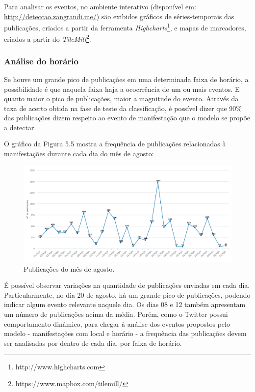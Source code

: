 Para analisar os eventos, no ambiente interativo (disponível em: \url{http://deteccao.zangrandi.me/}) são exibidos gráficos de séries-temporais das publicações, criados a partir da ferramenta \textit{Highcharts}\footnote{http://www.highcharts.com}, e mapas de marcadores, criados a partir do \textit{TileMill}\footnote{https://www.mapbox.com/tilemill/}.

\subsubsection*{Análise do horário}

Se houve um grande pico de publicações em uma determinada faixa de horário, a possibilidade é que naquela faixa haja a ococrrência de um ou mais eventos. E quanto maior o pico de publicações, maior a magnitude do evento. Através da taxa de acerto obtida na fase de teste da classificação, é possível dizer que 90\% das publicações dizem respeito ao evento de manifestação que o modelo se propõe a detectar.

O gráfico da Figura 5.5 mostra a frequência de publicações relacionadas à manifestações durante cada dia do mês de agosto:

\begin{figure}[htpb]
  \begin{center}
    \includegraphics[width=1.0\textwidth]{figuras/grafico-mes.pdf}
    \caption{Publicações do mês de agosto.}
  \end{center}
\end{figure}

É possível observar variações na quantidade de publicações enviadas em cada dia. Particularmente, no dia 20 de agosto, há um grande pico de publicações, podendo indicar algum evento relevante naquele dia. Os dias 08 e 12 também apresentam um número de publicações acima da média. Porém, como o Twitter possui comportamento dinâmico, para chegar à análise dos eventos propostos pelo modelo - manifestações com local e horário - a frequência das publicações devem ser analisadas por dentro de cada dia, por faixa de horário. 

